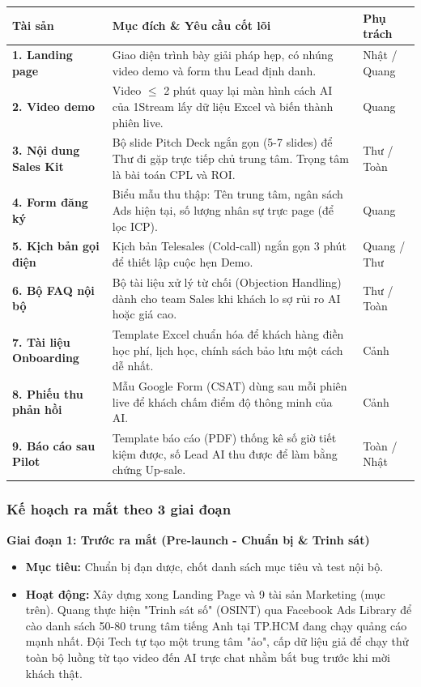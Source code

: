 \begin{table}[H]
    \centering
    \footnotesize
    \renewcommand{\arraystretch}{1.3}
    \begin{tabularx}{\linewidth}{|l|X|l|}
        \hline
        \rowcolor{softBlue}
        \textbf{Tài sản} & \textbf{Mục đích \& Yêu cầu cốt lõi} & \textbf{Phụ trách} \\ \hline
        \textbf{1. Landing page} & Giao diện trình bày giải pháp hẹp, có nhúng video demo và form thu Lead định danh. & Nhật / Quang \\ \hline
        \textbf{2. Video demo} & Video $\le$ 2 phút quay lại màn hình cách AI của 1Stream lấy dữ liệu Excel và biến thành phiên live. & Quang \\ \hline
        \textbf{3. Nội dung Sales Kit} & Bộ slide Pitch Deck ngắn gọn (5-7 slides) để Thư đi gặp trực tiếp chủ trung tâm. Trọng tâm là bài toán CPL và ROI. & Thư / Toàn \\ \hline
        \textbf{4. Form đăng ký} & Biểu mẫu thu thập: Tên trung tâm, ngân sách Ads hiện tại, số lượng nhân sự trực page (để lọc ICP). & Quang \\ \hline
        \textbf{5. Kịch bản gọi điện} & Kịch bản Telesales (Cold-call) ngắn gọn 3 phút để thiết lập cuộc hẹn Demo. & Quang / Thư \\ \hline
        \textbf{6. Bộ FAQ nội bộ} & Bộ tài liệu xử lý từ chối (Objection Handling) dành cho team Sales khi khách lo sợ rủi ro AI hoặc giá cao. & Thư / Toàn \\ \hline
        \textbf{7. Tài liệu Onboarding} & Template Excel chuẩn hóa để khách hàng điền học phí, lịch học, chính sách bảo lưu một cách dễ nhất. & Cảnh \\ \hline
        \textbf{8. Phiếu thu phản hồi} & Mẫu Google Form (CSAT) dùng sau mỗi phiên live để khách chấm điểm độ thông minh của AI. & Cảnh \\ \hline
        \textbf{9. Báo cáo sau Pilot} & Template báo cáo (PDF) thống kê số giờ tiết kiệm được, số Lead AI thu được để làm bằng chứng Up-sale. & Toàn / Nhật \\ \hline
    \end{tabularx}
\end{table}

\subsubsection{Kế hoạch ra mắt theo 3 giai đoạn}

\textbf{Giai đoạn 1: Trước ra mắt (Pre-launch - Chuẩn bị \& Trinh sát)}
\begin{itemize}
    \item \textbf{Mục tiêu:} Chuẩn bị đạn dược, chốt danh sách mục tiêu và test nội bộ.
    \item \textbf{Hoạt động:} Xây dựng xong Landing Page và 9 tài sản Marketing (mục trên). Quang thực hiện "Trinh sát số" (OSINT) qua Facebook Ads Library để cào danh sách 50-80 trung tâm tiếng Anh tại TP.HCM đang chạy quảng cáo mạnh nhất. Đội Tech tự tạo một trung tâm "ảo", cấp dữ liệu giả để chạy thử toàn bộ luồng từ tạo video đến AI trực chat nhằm bắt bug trước khi mời khách thật.
\end{itemize}

